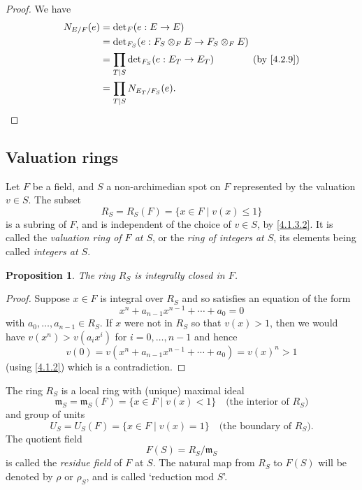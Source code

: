 \documentclass[10pt,leqno]{article}
\newtheorem{prop}[theo]{Proposition}
\theoremstyle{definition}
\def\mm{\mathfrak{m}}
\def\qw#1{`#1'}
\begin{document}
\begin{proof}
We have
\begin{align*}
N_{E/F}(e) 
&= \det{}_{\!F}(e : E \to E)
\\
&= \det{}_{\!F_S} (e : F_S \otimes_F E \to F_S \otimes_F E)
\\
&= \prod_{T \mid S} \det{}_{\!F_S}(e : E_T \to E_T)
\qquad\qquad\text{(by \eqref{4.2.9})}
\\
&= \prod_{T \mid S} N_{E_T/F_S}(e).
\qedhere
\end{align*}
\end{proof}



\subsection{Valuation rings}
\label{ch:4.3}

Let $F$ be a field, and $S$ a non-archimedian spot on $F$ represented by the valuation $v \in S$.
The subset
\begin{equation}
\label{4.3.1}
R_S = R_S(F)
= \{ x \in F \mid v(x) \leq 1 \}
\end{equation}
is a subring of $F$, and is independent of the choice of $v \in S$, by \eqref{4.1.3.2}.
It is called the \emph{valuation ring of $F$ at $S$}, or the \emph{ring of integers at $S$}, its elements being called \emph{integers at $S$}.


\begin{prop}
\label{4.3.2}
The ring $R_S$ is integrally closed in $F$.
\end{prop}

\begin{proof}
Suppose $x \in F$ is integral over $R_S$ and so satisfies an equation of the form
\[
x^n + a_{n-1} x^{n-1} + \cdots + a_0 = 0
\]
with $a_0, \ldots, a_{n-1} \in R_S$.
If $x$ were not in $R_S$ so that $v(x) > 1$, then we would have $v(x^n) > v(a_i x^i)$ for $i = 0, \ldots, n-1$ and hence
\[
v(0) = v(x^n + a_{n-1} x^{n-1} + \cdots + a_0) = v(x)^n > 1
\]
(using \ref{4.1.2}) which is a contradiction.
\end{proof}

The ring $R_S$ is a local ring with (unique) maximal ideal
\begin{equation}
\label{4.3.3}
\mm_S = \mm_S(F) = \{ x \in F \mid v(x) < 1 \}
\quad
\text{(the interior of $R_S$)}
\end{equation}
and group of units
\begin{equation}
\label{4.3.4}
U_S = U_S(F) = \{ x \in F \mid v(x) = 1 \}
\quad
\text{(the boundary of $R_S$).}
\end{equation}
The quotient field
\begin{equation}
\label{4.3.5}
F(S) = R_S / \mm_S
\end{equation}
is called the \emph{residue field} of $F$ at $S$.
The natural map from $R_S$ to $F(S)$ will be denoted by $\rho$ or $\rho_S$, and is called \qw{reduction mod $S$}.
\end{document}
